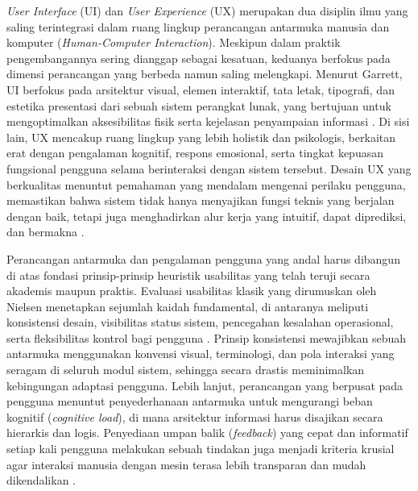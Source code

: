 \documentclass[12pt,a4paper,twoside]{report}
\begin{document}
\textit{User Interface} (UI) dan \textit{User Experience} (UX) merupakan dua disiplin ilmu yang saling terintegrasi dalam ruang lingkup perancangan antarmuka manusia dan komputer (\textit{Human-Computer Interaction}). Meskipun dalam praktik pengembangannya sering dianggap sebagai kesatuan, keduanya berfokus pada dimensi perancangan yang berbeda namun saling melengkapi. Menurut Garrett, UI berfokus pada arsitektur visual, elemen interaktif, tata letak, tipografi, dan estetika presentasi dari sebuah sistem perangkat lunak, yang bertujuan untuk mengoptimalkan aksesibilitas fisik serta kejelasan penyampaian informasi \cite{garrett2010}. Di sisi lain, UX mencakup ruang lingkup yang lebih holistik dan psikologis, berkaitan erat dengan pengalaman kognitif, respons emosional, serta tingkat kepuasan fungsional pengguna selama berinteraksi dengan sistem tersebut. Desain UX yang berkualitas menuntut pemahaman yang mendalam mengenai perilaku pengguna, memastikan bahwa sistem tidak hanya menyajikan fungsi teknis yang berjalan dengan baik, tetapi juga menghadirkan alur kerja yang intuitif, dapat diprediksi, dan bermakna \cite{norman2013}.

Perancangan antarmuka dan pengalaman pengguna yang andal harus dibangun di atas fondasi prinsip-prinsip heuristik usabilitas yang telah teruji secara akademis maupun praktis. Evaluasi usabilitas klasik yang dirumuskan oleh Nielsen menetapkan sejumlah kaidah fundamental, di antaranya meliputi konsistensi desain, visibilitas status sistem, pencegahan kesalahan operasional, serta fleksibilitas kontrol bagi pengguna \cite{nielsen1994}. Prinsip konsistensi mewajibkan sebuah antarmuka menggunakan konvensi visual, terminologi, dan pola interaksi yang seragam di seluruh modul sistem, sehingga secara drastis meminimalkan kebingungan adaptasi pengguna. Lebih lanjut, perancangan yang berpusat pada pengguna menuntut penyederhanaan antarmuka untuk mengurangi beban kognitif (\textit{cognitive load}), di mana arsitektur informasi harus disajikan secara hierarkis dan logis. Penyediaan umpan balik (\textit{feedback}) yang cepat dan informatif setiap kali pengguna melakukan sebuah tindakan juga menjadi kriteria krusial agar interaksi manusia dengan mesin terasa lebih transparan dan mudah dikendalikan \cite{norman2013}.
\end{document}
